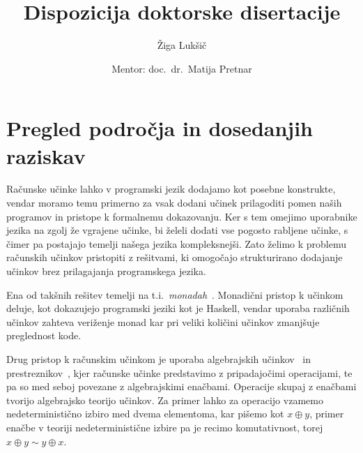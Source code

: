 \documentclass{article}
\title{Dispozicija doktorske disertacije}
\author{Žiga Lukšič \and Mentor: doc.\ dr.\ Matija Pretnar}
\date{}
\newcommand{\todo}[1]{{\color{red}{#1}}}
\begin{document}
\maketitle

\vspace{-10mm}
\begin{center}
  \Large{\textsc{\textbf{\todo{???}}}}

  \Large{\textsc{\textbf{\todo{??? but in english}}}}
\end{center}

\section*{Pregled področja in dosedanjih raziskav}

\todo{Pri zasnovi programskih jezikov je ključnega pomena močno matematično ogro\-dje jezika, ki zagotavlja smiselnost in pravilnost napisane kode. Programe lahko predstavimo z matematičnimi objekti, kar nam omogoča boljši vpogled v delovanje, hkrati pa pridobimo močna orodja za analizo in formalno dokazovanje pravilnosti programov. Vendar matematični objekti, kot na primer funkcije, ne vplivajo na svoje okolje. Tako so računski učinki, kot na primer izpisovanje besedila na zaslonu, odčitavanje podatkov iz senzorjev ali komunikacija z oddaljenim strežnikom, velik izziv za matematično formulacijo.}

Računske učinke lahko v programski jezik dodajamo kot posebne konstrukte, vendar moramo temu primerno za vsak dodani učinek prilagoditi pomen naših programov in pristope k formalnemu dokazovanju. Ker s tem omejimo uporabnike jezika na zgolj že vgrajene učinke, bi želeli dodati vse pogosto rabljene učinke, s čimer pa postajajo temelji našega jezika kompleksnejši. Zato želimo k problemu računskih učinkov pristopiti z rešitvami, ki omogočajo strukturirano dodajanje učinkov brez prilagajanja programskega jezika.

Ena od takšnih rešitev temelji na t.i.\ \emph{monadah}~\cite{DBLP:journals/iandc/Moggi91}. Monadični pristop k učinkom deluje, kot dokazujejo programski jeziki kot je Haskell, vendar uporaba različnih učinkov zahteva veriženje monad kar pri veliki količini učinkov zmanj\-šuje preglednost kode.

Drug pristop k računskim učinkom je uporaba algebrajskih učinkov~\cite{DBLP:conf/fossacs/PlotkinP01, DBLP:journals/acs/PlotkinP03} in prestreznikov~\cite{DBLP:conf/esop/PlotkinP09}, kjer računske učinke predstavimo z pripadajočimi operacijami, te pa so med seboj povezane z algebrajskimi enačbami. Operacije skupaj z enačbami tvorijo algebrajsko teorijo učinkov. Za primer lahko za operacijo vzamemo nedeterministično izbiro med dvema elementoma, kar pišemo kot $x \oplus y$, primer enačbe v teoriji nedeterministične izbire pa je recimo komutativnost, torej $x \oplus y \sim y \oplus x$.
\end{document}
